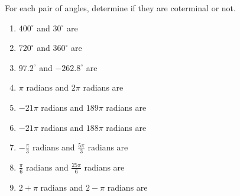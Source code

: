 \documentclass{ximera}
\author{Kenneth Berglund}
\begin{document}
\begin{exercise}
For each pair of angles, determine if they are coterminal or not.

\begin{enumerate}
\item 
$400^\circ$ and $30^\circ$ are
\begin{multipleChoice}
\end{multipleChoice}

\item
$720^\circ$ and $360^\circ$ are
\begin{multipleChoice}
\end{multipleChoice}

\item
$97.2^\circ$ and $-262.8^\circ$ are
\begin{multipleChoice}
\end{multipleChoice}

\item
$\pi$ radians and $2\pi$ radians are
\begin{multipleChoice}
\end{multipleChoice}

\item
$-21\pi$ radians and $189\pi$ radians are
\begin{multipleChoice}
\end{multipleChoice}


\item
$-21\pi$ radians and $188\pi$ radians are
\begin{multipleChoice}
\end{multipleChoice}


\item
$-\frac{\pi}{3}$ radians and $\frac{5\pi}{3}$ radians are
\begin{multipleChoice}
\end{multipleChoice}


\item
$\frac{\pi}{6}$ radians and $\frac{25\pi}{6}$ radians are
\begin{multipleChoice}
\end{multipleChoice}


\item
$2 + \pi$ radians and $2 - \pi$ radians are
\begin{multipleChoice}
\end{multipleChoice}

\end{enumerate}



\end{exercise}
\end{document}
